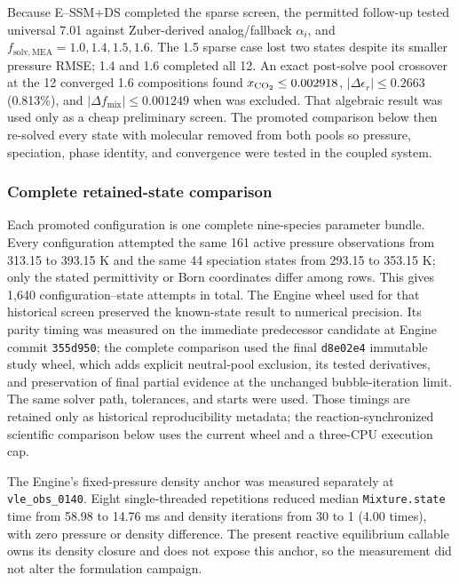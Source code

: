 \documentclass[10pt,oneside]{scrartcl}
\begin{document}
Because E--SSM+DS completed the sparse screen, the permitted follow-up tested
universal 7.01 against Zuber-derived analog/fallback $\alpha_i$, and
$f_{\mathrm{solv},\mathrm{MEA}}=1.0,1.4,1.5,1.6$. The 1.5 sparse case lost two
states despite its smaller pressure RMSE; 1.4 and 1.6 completed all 12. An
exact post-solve pool crossover at the 12 converged 1.6 compositions found
$x_{\ce{CO2}}\leq0.002918$, $|\Delta\epsilon_r|\leq0.2663$ (0.813\%), and
$|\Delta f_{\mathrm{mix}}|\leq0.001249$ when  was excluded. That
algebraic result was used only as a cheap preliminary screen. The promoted
comparison below then re-solved every state with molecular  removed
from both pools so pressure, speciation, phase identity, and convergence were
tested in the coupled system.

\subsubsection{Complete retained-state comparison}

Each promoted configuration is one complete nine-species parameter bundle.
Every configuration attempted the same 161 active pressure observations from
313.15 to 393.15 K and the same 44 speciation states from 293.15 to 353.15 K;
only the stated permittivity or Born coordinates differ among rows. This gives
1,640 configuration--state attempts in total. The Engine wheel used for that
historical screen preserved the known-state result to numerical precision.
Its parity timing was
measured on the immediate predecessor candidate at Engine commit
\nolinkurl{355d950}; the complete comparison used the final
\nolinkurl{d8e02e4} immutable study wheel, which adds explicit neutral-pool
exclusion, its tested derivatives, and preservation of final partial evidence
at the unchanged bubble-iteration limit. The same solver path, tolerances,
and starts were used. Those timings are retained only as historical
reproducibility metadata; the reaction-synchronized scientific comparison
below uses the current wheel and a three-CPU execution cap.

The Engine's fixed-pressure density anchor was measured separately at
\texttt{vle\_obs\_0140}. Eight single-threaded repetitions reduced median
\texttt{Mixture.state} time from 58.98 to 14.76 ms and density iterations from
30 to 1 (4.00 times), with zero pressure or density difference. The present
reactive equilibrium callable owns its density closure and does not expose
this anchor, so the measurement did not alter the formulation campaign.
\end{document}
